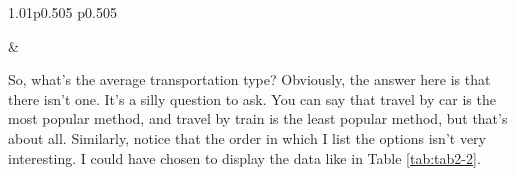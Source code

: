 \documentclass[
]{book}
\begin{document}
\begin{table}[ht]
\begin{centerbox}
\begin{threeparttable}
\begin{tabularx}{1.01\textwidth}{p{} p{}}
\hhline{}

 &
 \tabularnewline[-0.5pt]


\end{tabularx}\captionsetup{justification=raggedright,singlelinecheck=off}
\caption{\label{tab:tab2-1} How did 100 people get to work today}
 
\end{threeparttable}\par\end{centerbox}

\end{table}
 

So, what's the average transportation type? Obviously, the answer here is that there isn't one. It's a silly question to ask. You can say that travel by car is the most popular method, and travel by train is the least popular method, but that's about all. Similarly, notice that the order in which I list the options isn't very interesting. I could have chosen to display the data like in Table \ref{tab:tab2-2}.

 
  \providecommand{\huxb}[2]{\arrayrulecolor[RGB]{#1}\global\arrayrulewidth=#2pt}
  \providecommand{\huxvb}[2]{\color[RGB]{#1}\vrule width #2pt}
  \providecommand{\huxtpad}[1]{\rule{0pt}{#1}}
  \providecommand{\huxbpad}[1]{\rule[-#1]{0pt}{#1}}
\end{document}
